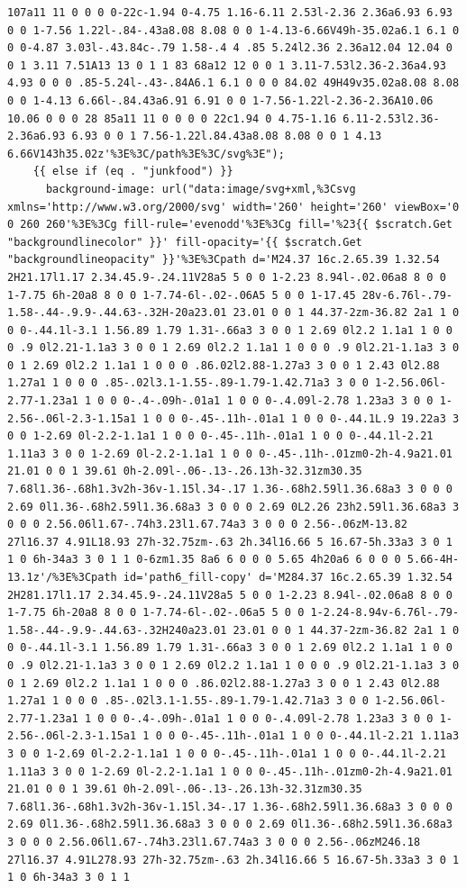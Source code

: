\documentclass[11pt]{article}
\begin{document}
\begin{enumerate}
\begin{verbatim}
107a11 11 0 0 0 0-22c-1.94 0-4.75 1.16-6.11 2.53l-2.36 2.36a6.93 6.93 0 0 1-7.56 1.22l-.84-.43a8.08 8.08 0 0 1-4.13-6.66V49h-35.02a6.1 6.1 0 0 0-4.87 3.03l-.43.84c-.79 1.58-.4 4 .85 5.24l2.36 2.36a12.04 12.04 0 0 1 3.11 7.51A13 13 0 1 1 83 68a12 12 0 0 1 3.11-7.53l2.36-2.36a4.93 4.93 0 0 0 .85-5.24l-.43-.84A6.1 6.1 0 0 0 84.02 49H49v35.02a8.08 8.08 0 0 1-4.13 6.66l-.84.43a6.91 6.91 0 0 1-7.56-1.22l-2.36-2.36A10.06 10.06 0 0 0 28 85a11 11 0 0 0 0 22c1.94 0 4.75-1.16 6.11-2.53l2.36-2.36a6.93 6.93 0 0 1 7.56-1.22l.84.43a8.08 8.08 0 0 1 4.13 6.66V143h35.02z'%3E%3C/path%3E%3C/svg%3E");
    {{ else if (eq . "junkfood") }}
      background-image: url("data:image/svg+xml,%3Csvg xmlns='http://www.w3.org/2000/svg' width='260' height='260' viewBox='0 0 260 260'%3E%3Cg fill-rule='evenodd'%3E%3Cg fill='%23{{ $scratch.Get "backgroundlinecolor" }}' fill-opacity='{{ $scratch.Get "backgroundlineopacity" }}'%3E%3Cpath d='M24.37 16c.2.65.39 1.32.54 2H21.17l1.17 2.34.45.9-.24.11V28a5 5 0 0 1-2.23 8.94l-.02.06a8 8 0 0 1-7.75 6h-20a8 8 0 0 1-7.74-6l-.02-.06A5 5 0 0 1-17.45 28v-6.76l-.79-1.58-.44-.9.9-.44.63-.32H-20a23.01 23.01 0 0 1 44.37-2zm-36.82 2a1 1 0 0 0-.44.1l-3.1 1.56.89 1.79 1.31-.66a3 3 0 0 1 2.69 0l2.2 1.1a1 1 0 0 0 .9 0l2.21-1.1a3 3 0 0 1 2.69 0l2.2 1.1a1 1 0 0 0 .9 0l2.21-1.1a3 3 0 0 1 2.69 0l2.2 1.1a1 1 0 0 0 .86.02l2.88-1.27a3 3 0 0 1 2.43 0l2.88 1.27a1 1 0 0 0 .85-.02l3.1-1.55-.89-1.79-1.42.71a3 3 0 0 1-2.56.06l-2.77-1.23a1 1 0 0 0-.4-.09h-.01a1 1 0 0 0-.4.09l-2.78 1.23a3 3 0 0 1-2.56-.06l-2.3-1.15a1 1 0 0 0-.45-.11h-.01a1 1 0 0 0-.44.1L.9 19.22a3 3 0 0 1-2.69 0l-2.2-1.1a1 1 0 0 0-.45-.11h-.01a1 1 0 0 0-.44.1l-2.21 1.11a3 3 0 0 1-2.69 0l-2.2-1.1a1 1 0 0 0-.45-.11h-.01zm0-2h-4.9a21.01 21.01 0 0 1 39.61 0h-2.09l-.06-.13-.26.13h-32.31zm30.35 7.68l1.36-.68h1.3v2h-36v-1.15l.34-.17 1.36-.68h2.59l1.36.68a3 3 0 0 0 2.69 0l1.36-.68h2.59l1.36.68a3 3 0 0 0 2.69 0L2.26 23h2.59l1.36.68a3 3 0 0 0 2.56.06l1.67-.74h3.23l1.67.74a3 3 0 0 0 2.56-.06zM-13.82 27l16.37 4.91L18.93 27h-32.75zm-.63 2h.34l16.66 5 16.67-5h.33a3 3 0 1 1 0 6h-34a3 3 0 1 1 0-6zm1.35 8a6 6 0 0 0 5.65 4h20a6 6 0 0 0 5.66-4H-13.1z'/%3E%3Cpath id='path6_fill-copy' d='M284.37 16c.2.65.39 1.32.54 2H281.17l1.17 2.34.45.9-.24.11V28a5 5 0 0 1-2.23 8.94l-.02.06a8 8 0 0 1-7.75 6h-20a8 8 0 0 1-7.74-6l-.02-.06a5 5 0 0 1-2.24-8.94v-6.76l-.79-1.58-.44-.9.9-.44.63-.32H240a23.01 23.01 0 0 1 44.37-2zm-36.82 2a1 1 0 0 0-.44.1l-3.1 1.56.89 1.79 1.31-.66a3 3 0 0 1 2.69 0l2.2 1.1a1 1 0 0 0 .9 0l2.21-1.1a3 3 0 0 1 2.69 0l2.2 1.1a1 1 0 0 0 .9 0l2.21-1.1a3 3 0 0 1 2.69 0l2.2 1.1a1 1 0 0 0 .86.02l2.88-1.27a3 3 0 0 1 2.43 0l2.88 1.27a1 1 0 0 0 .85-.02l3.1-1.55-.89-1.79-1.42.71a3 3 0 0 1-2.56.06l-2.77-1.23a1 1 0 0 0-.4-.09h-.01a1 1 0 0 0-.4.09l-2.78 1.23a3 3 0 0 1-2.56-.06l-2.3-1.15a1 1 0 0 0-.45-.11h-.01a1 1 0 0 0-.44.1l-2.21 1.11a3 3 0 0 1-2.69 0l-2.2-1.1a1 1 0 0 0-.45-.11h-.01a1 1 0 0 0-.44.1l-2.21 1.11a3 3 0 0 1-2.69 0l-2.2-1.1a1 1 0 0 0-.45-.11h-.01zm0-2h-4.9a21.01 21.01 0 0 1 39.61 0h-2.09l-.06-.13-.26.13h-32.31zm30.35 7.68l1.36-.68h1.3v2h-36v-1.15l.34-.17 1.36-.68h2.59l1.36.68a3 3 0 0 0 2.69 0l1.36-.68h2.59l1.36.68a3 3 0 0 0 2.69 0l1.36-.68h2.59l1.36.68a3 3 0 0 0 2.56.06l1.67-.74h3.23l1.67.74a3 3 0 0 0 2.56-.06zM246.18 27l16.37 4.91L278.93 27h-32.75zm-.63 2h.34l16.66 5 16.67-5h.33a3 3 0 1 1 0 6h-34a3 3 0 1 1 
\end{verbatim}
\end{enumerate}
\end{document}
